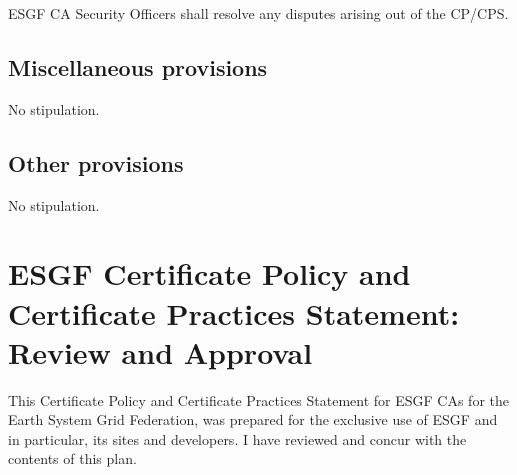 ESGF CA Security Officers shall resolve any disputes arising out of the
CP/CPS.

\subsection{Miscellaneous provisions}\label{miscellaneous-provisions}

No stipulation.

\subsection{Other provisions}\label{other-provisions}

No stipulation.
\newpage
\section{ESGF Certificate Policy and Certificate Practices Statement: Review and Approval}
This Certificate Policy and Certificate Practices Statement for ESGF CAs for the Earth System Grid Federation, was prepared for the exclusive use of ESGF and in particular, its sites and developers. I have reviewed and concur with the contents of this plan.
\par\vspace{1cm}
